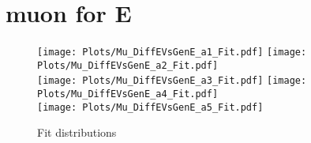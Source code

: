 \documentclass[a4paper,10pt]{article}
\begin{document}
\newpage 
\section{muon for E}
 \begin{figure}[h!b] 
  \texttt{[image: Plots/Mu\_DiffEVsGenE\_a1\_Fit.pdf]} 
  \texttt{[image: Plots/Mu\_DiffEVsGenE\_a2\_Fit.pdf]} \\ 
  \texttt{[image: Plots/Mu\_DiffEVsGenE\_a3\_Fit.pdf]} 
  \texttt{[image: Plots/Mu\_DiffEVsGenE\_a4\_Fit.pdf]} \\ 
  \texttt{[image: Plots/Mu\_DiffEVsGenE\_a5\_Fit.pdf]} 
 \caption{Fit distributions} 
\end{figure} 
\end{document}
